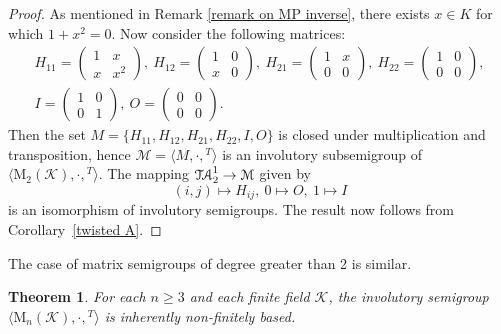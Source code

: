 \documentclass[11pt,reqno]{amsart}
\numberwithin{equation}{section}
\newtheorem{Thm}{Theorem}[section]
\theoremstyle{remark}
\def\TA{\ensuremath{\mathcal{T\kern-1pt A}_2^1}}
\begin{document}
\begin{proof} As mentioned in Remark \ref{remark on MP inverse},
there exists $x\in K$ for which $1+x^2=0$. Now consider the
following matrices:
\begin{gather*}
H_{11}=\begin{pmatrix} 1 & x\\ x &x^2\end{pmatrix},\
H_{12}=\begin{pmatrix} 1 & 0\\ x &0\end{pmatrix},\
H_{21}=\begin{pmatrix} 1 & x\\ 0 & 0\end{pmatrix},\
H_{22}=\begin{pmatrix} 1 & 0\\ 0 & 0\end{pmatrix},\\
I=\begin{pmatrix}1 & 0\\ 0& 1\end{pmatrix},\ O=\begin{pmatrix} 0 &
0 \\ 0 & 0 \end{pmatrix}.
\end{gather*}
Then the set $M=\{H_{11},H_{12},H_{21}, H_{22},I, O\}$ is closed
under multiplication and transposition, hence $\mathcal{M}=\langle
M, \cdot,{}^T\rangle$ is an involutory subsemigroup of
$\langle\mathrm{M}_2(\mathcal{K}),\cdot,{}^T\rangle$. The mapping
$\TA\to \mathcal{M}$ given by
$$(i,j)\mapsto H_{ij},\ 0\mapsto O,\ 1\mapsto I$$
is an isomorphism of involutory semigroups. The result now follows
from Corollary~\ref{twisted A}.
\end{proof}

The case of matrix semigroups of degree greater than 2 is similar.

\begin{Thm} \label{inherently degree 3}
For each $n\ge 3$ and each finite field $\mathcal{K}$, the
involutory semigroup
$\langle\mathrm{M}_n(\mathcal{K}),\cdot,{}^T\rangle$ is inherently
non-finitely based.
\end{Thm}
\end{document}
